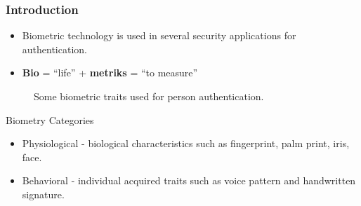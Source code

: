 \documentclass{beamer}
\begin{document}
\begin{frame}
\frametitle{Introduction}

\begin{itemize}
\item Biometric technology is used in several security applications for authentication.
\item \textbf{Bio} = ``life'' + \textbf{metriks} = ``to measure''
\end{itemize}

\begin{figure}[!htb]
\centering

\hspace*{0.1in} %
\hspace*{0.1in}%
\hspace*{0.1in}%
 
\caption{Some biometric traits used for person authentication. } %



\end{figure}
\pause
\begin{block}{Biometry Categories}
\begin{itemize}
\item Physiological - biological characteristics such as fingerprint, palm print, iris, face.
\item Behavioral - individual acquired traits such as voice pattern and handwritten signature. 


\end{itemize}
\end{block}
\end{frame}
\end{document}
